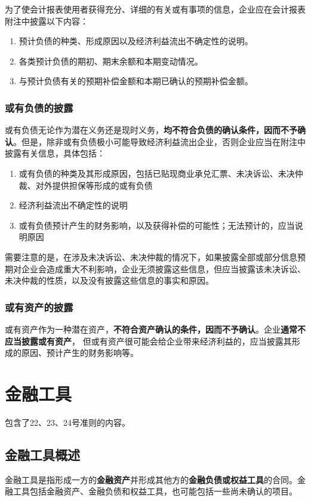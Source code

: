 \documentclass[UTF8,12pt]{ctexart}
\numberwithin{equation}{section} %
\numberwithin{figure}{section}
\numberwithin{table}{section}
\begin{document}
	为了使会计报表使用者获得充分、详细的有关或有事项的信息，企业应在会计报表  附注中披露以下内容：
	\begin{enumerate}
		\item 预计负债的种类、形成原因以及经济利益流出不确定性的说明。
		
		\item 各类预计负债的期初、期末余额和本期变动情况。
		
		\item 与预计负债有关的预期补偿金额和本期已确认的预期补偿金额。
	\end{enumerate}
	
	
	\subsubsection{或有负债的披露}
	或有负债无论作为潜在义务还是现时义务，\textbf{均不符合负债的确认条件，因而不予确认}。但是，除非或有负债极小可能导致经济利益流出企业，否则企业应当在附注中披露有关信息，具体包括：
	
	\begin{enumerate}
		\item 或有负债的种类及其形成原因，包括已贴现商业承兑汇票、未决诉讼、未决仲裁、对外提供担保等形成的或有负债
		
		\item 经济利益流出不确定性的说明
		
		\item 或有负债预计产生的财务影响，以及获得补偿的可能性；无法预计的，应当说明原因
	\end{enumerate}
	
	需要注意的是，在涉及未决诉讼、未决仲裁的情况下，如果披露全部或部分信息预期对企业会造成重大不利影响，企业无须披露这些信息，但应当披露该未决诉讼、未决仲裁的性质，以及没有披露这些信息的事实和原因。
	
	
	\subsubsection{或有资产的披露}
	或有资产作为一种潜在资产，\textbf{不符合资产确认的条件，因而不予确认}。企业\textbf{通常不应当披露或有资产}， 但或有资产很可能会给企业带来经济利益的，应当披露其形成的原因、预计产生的财务影响等。
	
	
	\newpage
	\section{金融工具}
	包含了22、23、24号准则的内容。
	\subsection{金融工具概述}
	金融工具是指形成一方的\textbf{金融资产}并形成其他方的\textbf{金融负债或权益工具}的合同。金融工具包括金融资产、金融负债和权益工具，也可能包括一些尚未确认的项目。
	
\end{document}
